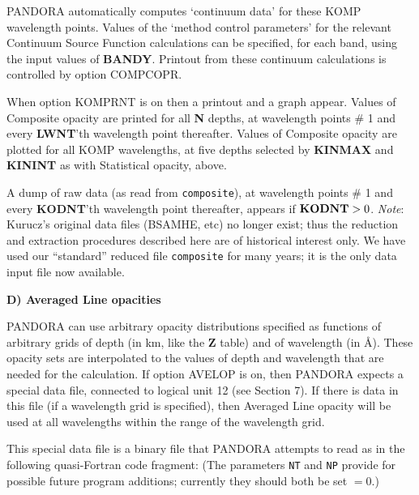 PANDORA automatically computes `continuum data' for these KOMP \break
wavelength points. Values of the `method control parameters'
for the relevant Continuum Source Function calculations can be specified,
for each band, using the input values of {\bf BANDY}. Printout from these
continuum calculations is controlled by option COMPCOPR.

When option KOMPRNT is on then a printout and a graph appear. Values of
Composite opacity are printed for all {\bf N} depths, at wavelength
points \# 1 and every {\bf LWNT}'th wavelength point thereafter. Values
of Composite opacity are plotted for all KOMP wavelengths, at five
depths selected by {\bf KINMAX} and {\bf KININT} as with Statistical
opacity, above.

A dump of raw data (as read from {\tt composite}), at wavelength points
\# 1 and every {\bf KODNT}'th wavelength point thereafter, appears if
${\bf KODNT} > 0$.
\blankline
\blankline
{\it Note}: Kurucz's original data files (BSAMHE, etc) no
longer exist; thus the reduction and extraction procedures described here are
of historical interest only. We have used our ``standard'' reduced file
{\tt composite} for many years; it is the only data input file now available.
\ej
\blankline
\blankline
\centerline{\bf D) Averaged Line opacities}
\blankline
PANDORA can use arbitrary opacity distributions specified as functions of
arbitrary grids of depth (in km, like the {\bf Z} table) and of wavelength
(in \AA). These opacity sets are interpolated to the values of depth
and wavelength that are needed for the calculation. If option AVELOP
is on, then PANDORA expects a special data file, connected to logical
unit 12 (see Section 7). If there is data in this
file (\ie if a wavelength grid is specified),
then Averaged Line opacity will be used at all wavelengths
within the range of the wavelength grid.

This special data file is a binary file that PANDORA attempts to read
as in the following quasi-Fortran code fragment:
\blankline
{} 
\blankline
\noindent (The parameters {\tt NT} and {\tt NP} provide for possible
future program additions; currently they should both be set $= 0$.)


